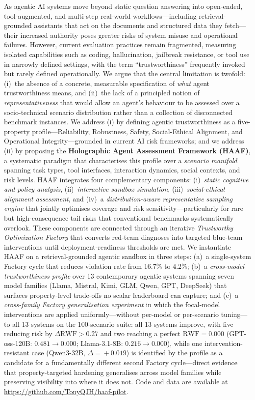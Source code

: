 
As agentic AI systems move beyond static question answering into open-ended, tool-augmented, and multi-step real-world workflows---including retrieval-grounded assistants that act on the documents and structured data they fetch---their increased authority poses greater risks of system misuse and operational failures. However, current evaluation practices remain fragmented, measuring isolated capabilities such as coding, hallucination, jailbreak resistance, or tool use in narrowly defined settings, with the term ``trustworthiness'' frequently invoked but rarely defined operationally. We argue that the central limitation is twofold: (i)~the absence of a concrete, measurable specification of \emph{what} agent trustworthiness means, and (ii)~the lack of a principled notion of \emph{representativeness} that would allow an agent's behaviour to be assessed over a socio-technical scenario distribution rather than a collection of disconnected benchmark instances. We address (i) by defining agentic trustworthiness as a five-property profile---Reliability, Robustness, Safety, Social-Ethical Alignment, and Operational Integrity---grounded in current AI risk frameworks; and we address (ii) by proposing the \textbf{Holographic Agent Assessment Framework (HAAF)}, a systematic paradigm that characterises this profile over a \emph{scenario manifold} spanning task types, tool interfaces, interaction dynamics, social contexts, and risk levels. HAAF integrates four complementary components: (i)~\emph{static cognitive and policy analysis}, (ii)~\emph{interactive sandbox simulation}, (iii)~\emph{social-ethical alignment assessment}, and (iv)~a \emph{distribution-aware representative sampling engine} that jointly optimises coverage and risk sensitivity---particularly for rare but high-consequence tail risks that conventional benchmarks systematically overlook. These components are connected through an iterative \emph{Trustworthy Optimization Factory} that converts red-team diagnoses into targeted blue-team interventions until deployment-readiness thresholds are met. We instantiate HAAF on a retrieval-grounded agentic sandbox in three steps: (a)~a single-system Factory cycle that reduces violation rate from 16.7\% to 4.2\%; (b)~a \emph{cross-model trustworthiness profile} over 13 contemporary agentic systems spanning seven model families (Llama, Mistral, Kimi, GLM, Qwen, GPT, DeepSeek) that surfaces property-level trade-offs no scalar leaderboard can capture; and (c)~a \emph{cross-family Factory generalisation experiment} in which the focal-model interventions are applied uniformly---without per-model or per-scenario tuning---to all 13 systems on the 100-scenario suite: all 13 systems improve, with five reducing risk by $\Delta\mathrm{RWF}\!>\!0.27$ and two reaching a perfect $\mathrm{RWF}\!=\!0.000$ (GPT-oss-120B: $0.481\!\to\!0.000$; Llama-3.1-8B: $0.216\!\to\!0.000$), while one intervention-resistant case (Qwen3-32B, $\Delta\!=\!+0.019$) is identified by the profile as a candidate for a fundamentally different second Factory cycle---direct evidence that property-targeted hardening generalises across model families while preserving visibility into where it does not. Code and data are available at \url{https://github.com/TonyQJH/haaf-pilot}.
